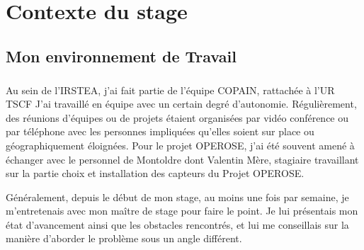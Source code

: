 \chapter{Contexte du stage}
\section{Mon environnement de Travail}
\paragraph{}
Au sein de l'IRSTEA, j'ai fait partie de l'équipe COPAIN,  rattachée à l'UR TSCF 
J'ai travaillé en équipe avec un certain degré d'autonomie. Régulièrement, des réunions d'équipes ou de projets étaient organisées par vidéo conférence ou par téléphone avec les personnes impliquées qu'elles soient sur place ou géographiquement éloignées. Pour le projet OPEROSE, j'ai été souvent amené à échanger avec le personnel de Montoldre dont Valentin Mère, stagiaire travaillant sur la partie choix et installation des capteurs du Projet OPEROSE.

Généralement, depuis le début de mon stage, au moins une fois par semaine, je m'entretenais avec mon maître de stage pour faire le point. Je lui présentais mon état d'avancement ainsi que les obstacles rencontrés, et lui me conseillais sur la manière d'aborder le problème sous un angle différent.

